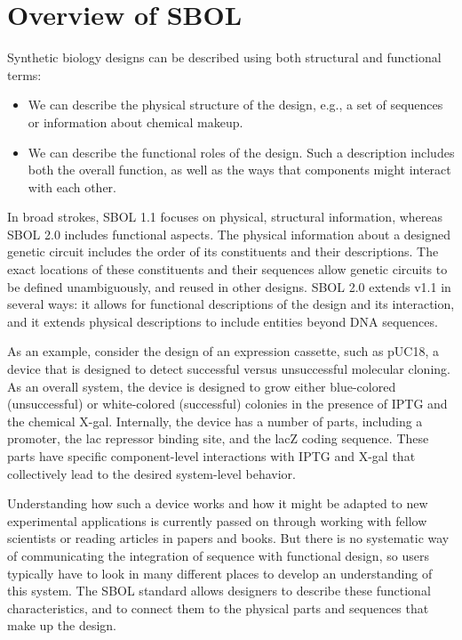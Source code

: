 \section{Overview of SBOL}


Synthetic biology designs can be described using both structural and functional terms:
\begin{itemize}
\item We can describe the physical structure of the design, e.g., a set of sequences or information about chemical makeup.
\item We can describe the functional roles of the design. Such a description includes both the overall function, as well as the ways that components might interact with each other.
\end{itemize}
In broad strokes, SBOL 1.1 focuses on physical, structural information, whereas SBOL 2.0 includes functional aspects. The physical information about a designed genetic circuit includes the order of its constituents and their descriptions. The exact locations of these constituents and their sequences allow genetic circuits to be defined unambiguously, and reused in other designs. SBOL 2.0 extends v1.1 in several ways: it allows for functional descriptions of the design and its interaction, and it extends physical descriptions to include entities beyond DNA sequences. 

As an example, consider the design of an expression cassette, such as pUC18, a device that is designed to detect successful versus unsuccessful molecular cloning. As an overall system, the device is designed to grow either blue-colored (unsuccessful) or white-colored (successful) colonies in the presence of IPTG and the chemical X-gal. Internally, the device has a number of parts, including a promoter, the lac repressor binding site, and the lacZ coding sequence. These parts have specific component-level interactions with IPTG and X-gal that collectively lead to the desired system-level behavior. 

Understanding how such a device works and how it might be adapted to new experimental applications is currently passed on through working with fellow scientists or reading articles in papers and books. But there is no systematic way of communicating the integration of sequence with functional design, so users typically have to look in many different places to develop an understanding of this system.  
The SBOL standard allows designers to describe these functional characteristics, and to connect them to the physical parts and sequences that make up the design. 

